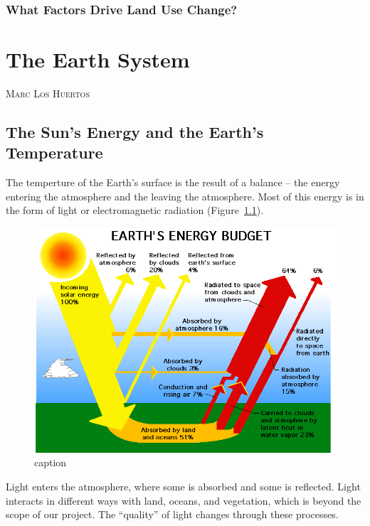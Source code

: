 \documentclass{book}\usepackage{knitr}
\makeatletter
\newcommand{\chapterauthor}[1]{%
  {\parindent0pt\vspace*{-25pt}%
  \linespread{1.1}\large\scshape#1%
  \par\nobreak\vspace*{35pt}}
  \@afterheading%
}
\makeatother
\begin{document}
\begin{knitrout}
\begin{kframe}
\subsection{What Factors Drive Land Use Change?}





\mainmatter


\chapter{The Earth System}\label{earthsystem}

\chapterauthor{Marc Los Huertos}

\section{The Sun's Energy and the Earth's Temperature}

The temperture of the Earth's surface is the result of a balance -- the energy entering the atmosphere and the leaving the atmosphere. Most of this energy is in the form of light or electromagnetic radiation (Figure~\ref{fig:earthbudget}). 

\begin{figure}
\includegraphics[width=\linewidth]{images/earth-system/earth-rad-budget-nasa-erbe.png}
\caption{caption}
\label{fig:earthbudget}
\end{figure}

Light enters the atmosphere, where some is absorbed and some is reflected. Light interacts in different ways with land, oceans, and vegetation, which is beyond the scope of our project. The ``quality'' of light changes through these processes. 


\end{kframe}
\end{knitrout}
\end{document}
